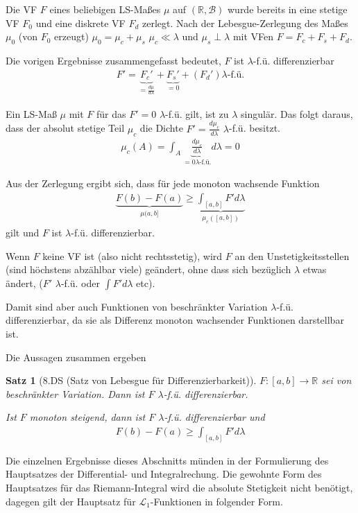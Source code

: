 \documentclass[]{article}
\newtheorem{theorem}{Satz}
\begin{document}
Die VF $F$ eines beliebigen LS-Maßes $\mu$ auf $(\mathbb{R}, \mathcal{B})$ wurde bereits in eine stetige VF $F_0$ und eine diskrete VF $F_d$ zerlegt. Nach der Lebesgue-Zerlegung des Maßes $\mu_0$ (von $F_0$ erzeugt) $\mu_0 = \mu_c + \mu_s$ $\mu_c \ll \lambda$ und $\mu_s \perp \lambda$ mit VFen $F = F_c + F_s + F_d$.

Die vorigen Ergebnisse zusammengefasst bedeutet, $F$ ist $\lambda$-f.ü. differenzierbar
\begin{align*}
	F' = \underbrace{F_c'}_{=\frac{d\mu}{d\lambda}} + \underbrace{F_s'}_{=0} + (F_d') \lambda\text{-f.ü.}
\end{align*}

Ein LS-Maß $\mu$ mit $F$ für das $F'=0$ $\lambda$-f.ü. gilt, ist zu $\lambda$ singulär. Das folgt daraus, dass der absolut stetige Teil $\mu_c$ die Dichte $F' = \frac{d\mu_c}{d\lambda}$ $\lambda$-f.ü. besitzt.
\begin{align*}
	\mu_c(A) = \int_A \underbrace{\frac{d\mu_c}{d\lambda}}_{=0 \lambda\text{-f.ü.}} d\lambda = 0
\end{align*}

Aus der Zerlegung ergibt sich, dass für jede monoton wachsende Funktion
\begin{align*}
	\underbrace{F(b)-F(a)}_{\mu(a,b]} \geq \underbrace{\int_{[a,b]} F' d\lambda}_{\mu_c([a,b])}
\end{align*}
gilt und $F$ ist $\lambda$-f.ü. differenzierbar.

Wenn $F$ keine VF ist (also nicht rechtsstetig), wird $F$ an den Unstetigkeitsstellen (sind höchstens abzählbar viele) geändert, ohne dass sich bezüglich $\lambda$ etwas ändert, ($F'$ $\lambda$-f.ü. oder $\int F' d\lambda$ etc).

Damit sind aber auch Funktionen von beschränkter Variation $\lambda$-f.ü. differenzierbar, da sie als Differenz monoton wachsender Funktionen darstellbar ist.

Die Aussagen zusammen ergeben
\begin{theorem}[8.DS (Satz von Lebesgue für Differenzierbarkeit)]
	$F:[a,b]\rightarrow\mathbb{R}$ sei von beschränkter Variation. Dann ist $F$ $\lambda$-f.ü. differenzierbar.
	
	Ist $F$ monoton steigend, dann ist $F$ $\lambda$-f.ü. differenzierbar und
	\begin{align*}
		F(b)-F(a) \geq \int_{[a,b]} F' d\lambda
	\end{align*}
\end{theorem}

Die einzelnen Ergebnisse dieses Abschnitts münden in der Formulierung des Hauptsatzes der Differential- und Integralrechung. Die gewohnte Form des Hauptsatzes für das Riemann-Integral wird die absolute Stetigkeit nicht benötigt, dagegen gilt der Hauptsatz für $\mathcal{L}_1$-Funktionen in folgender Form.
\end{document}
